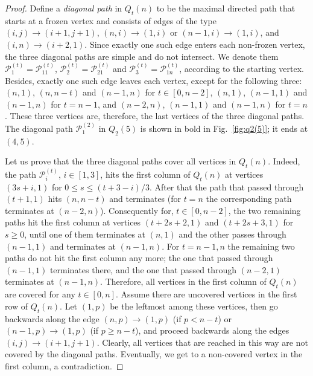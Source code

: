 \documentclass{amsart}
\theoremstyle{definition}
\theoremstyle{remark}
\numberwithin{equation}{section}
\numberwithin{theorem}{section}
\begin{document}
\begin{proof} 
Define a {\em diagonal path\/} in $Q_t(n)$ to be the maximal directed path that starts at a
frozen vertex and consists of edges of the type $(i,j)\to (i+1,j+1)$, $(n, i) \to (1,
i)$ or $(n-1,i)\to (1,i)$, and $(i, n) \to (i+2, 1)$. Since exactly one such edge enters each non-frozen
vertex, the three diagonal paths are simple and do not intersect. We denote them 
${{\mathcal P}}_1^{(t)}={{\mathcal P}}_{11}^{(t)}$, ${{\mathcal P}}_2^{(t)}={{\mathcal P}}_{21}^{(t)}$ and ${{\mathcal P}}_3^{(t)}={{\mathcal P}}_{1n}^{(t)}$,  
according to the starting vertex. Besides, exactly one such edge
leaves each vertex, except for the following three: $(n,1)$, $(n,n-t)$ and $(n-1,n)$ for $t\in [0,n-2]$,
$(n,1)$, $(n-1,1)$ and $(n-1,n)$ for $t=n-1$, and $(n-2,n)$, $(n-1,1)$ and $(n-1,n)$ for $t=n$. 
These three vertices
are, therefore, the last vertices of the three diagonal paths. The diagonal path ${{\mathcal P}}_1^{(2)}$ in
$Q_2(5)$ is shown in bold in Fig.~\ref{fig:q2(5)}; it ends at $(4,5)$.

Let us prove that the three diagonal paths cover all vertices in $Q_t(n)$. Indeed, the path ${{\mathcal P}}_i^{(t)}$, 
$i\in [1,3]$, hits the first column of $Q_t(n)$ at vertices $(3s+i,1)$ for $0\le s\le (t+3-i)/3$.
After that the path that passed through $(t+1,1)$ hits $(n,n-t)$ and terminates (for $t=n$ the
corresponding path terminates at $(n-2,n)$). Consequently for, $t\in [0,n-2]$, the
two remaining paths hit the first column at vertices $(t+2s+2,1)$ and $(t+2s+3,1)$ for $s\ge 0$, until
one of them terminates at $(n,1)$ and the other passes through $(n-1,1)$ and terminates at $(n-1,n)$.
For $t=n-1, n$ the remaining two paths do not hit the first column any more; the one that passed through
$(n-1,1)$ terminates there, and the one that passed through $(n-2,1)$ terminates at $(n-1,n)$. 
Therefore, all vertices in the first column of $Q_t(n)$ are covered for any $t\in [0,n]$. Assume there are uncovered 
vertices in the first row of $Q_t(n)$. Let $(1,p)$ be the leftmost among these vertices, then go backwards
along the edge $(n,p)\to (1,p)$ (if $p<n-t$) or $(n-1,p)\to (1,p)$ (if $p\ge n-t$), and proceed backwards 
along the edges $(i,j)\to (i+1,j+1)$. Clearly, all vertices that are reached in this way are not covered by
 the diagonal paths. Eventually, we get to a non-covered vertex in the first column, a contradiction.


\end{proof}
\end{document}
